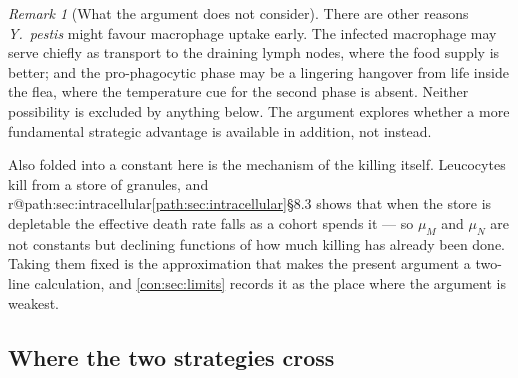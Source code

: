 \documentclass[11pt,a4paper]{report}
\makeatletter
\newcommand{\yp}{\textit{Y.~pestis}}
\providecommand{\mextref}[2]{%
  \ifcsname r@#1\endcsname\cref{#1}\else#2\fi}
\theoremstyle{plain}
\theoremstyle{remark}
\newtheorem{remark}[theorem]{Remark}
\makeatother
\begin{document}
\begin{remark}[What the argument does not consider]
\label{con:rem:alternatives}
There are other reasons \yp{} might favour macrophage uptake early. The
infected macrophage may serve chiefly as transport to the draining lymph
nodes, where the food supply is better; and the pro-phagocytic phase may be a
lingering hangover from life inside the flea, where the temperature cue for
the second phase is absent. Neither possibility is excluded by anything
below. The argument explores whether a more fundamental strategic advantage
is available in addition, not instead.
\end{remark}

Also folded into a constant here is the mechanism of the killing itself.
Leucocytes kill from a store of granules, and
\mextref{path:sec:intracellular}{\S8.3} shows that when the store is
depletable the effective death rate falls as a cohort spends it --- so
$\mu_M$ and $\mu_N$ are not constants but declining functions of how much
killing has already been done. Taking them fixed is the approximation that
makes the present argument a two-line calculation, and
\cref{con:sec:limits} records it as the place where the argument is weakest.

\subsection{Where the two strategies cross}
\label{con:sec:quadrant-threshold}
\end{document}
